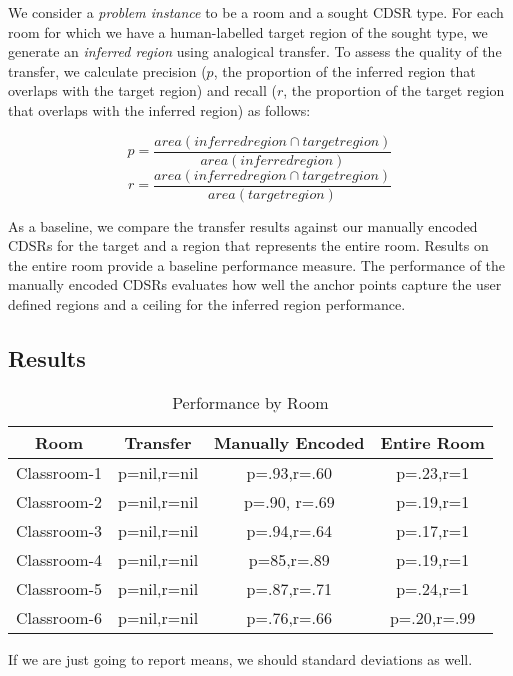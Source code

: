 We consider a \textit{problem instance} to be a room and a sought CDSR type. For each room for which we have a human-labelled target region of the sought type, we generate an \textit{inferred region} using analogical transfer. To assess the quality of the transfer, we calculate precision ($p$, the proportion of the inferred region that overlaps with the target region) and recall ($r$, the proportion of the target region that overlaps with the inferred region) as follows:

\begin{equation}
	p=\frac{area(inferred region \cap target region)}{area(inferred region)}
\end{equation}
\begin{equation}
	r=\frac{area(inferred region \cap target region)}{area(target region)}
\end{equation}


As a baseline, we compare the transfer results against our manually encoded CDSRs for the target and a region that represents the entire room. Results on the entire room provide a baseline performance measure. The performance of the manually encoded CDSRs evaluates how well the anchor points capture the user defined regions and a ceiling for the inferred region performance.


\subsection{Results}
\begin{table}
\small
\caption{Performance by Room}
\begin{tabular}{|c|c|c|c|}
\hline
Room & Transfer & Manually Encoded & Entire Room \\
\hline
Classroom-1 & p=nil,r=nil & p=.93,r=.60 & p=.23,r=1 \\
Classroom-2 & p=nil,r=nil & p=.90, r=.69 & p=.19,r=1 \\
Classroom-3 & p=nil,r=nil & p=.94,r=.64 & p=.17,r=1 \\
Classroom-4 & p=nil,r=nil & p=85,r=.89 & p=.19,r=1 \\  %
Classroom-5 & p=nil,r=nil & p=.87,r=.71 & p=.24,r=1 \\ %
Classroom-6 & p=nil,r=nil & p=.76,r=.66 & p=.20,r=.99 \\ %
\hline
\end{tabular}
\end{table}


If we are just going to report means, we should standard deviations as well. %

